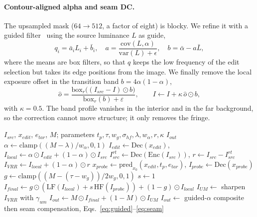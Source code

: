 \documentclass[10pt,twocolumn,letterpaper]{article}
\newcommand{\HF}{\mathrm{HF}}
\newcommand{\LF}{\mathrm{LF}}
\newcommand{\Dec}{\mathrm{Dec}}
\newcommand{\Enc}{\mathrm{Enc}}
\begin{document}
\paragraph{Contour-aligned alpha and seam DC.} The upsampled mask
($64\!\rightarrow\!512$, a factor of eight) is blocky. We refine it with a guided
filter~\cite{guided} using the source luminance $L$ as guide,
\begin{equation}
  q_i=\bar a_i L_i+\bar b_i,\quad
  a=\frac{\mathrm{cov}(L,\alpha)}{\mathrm{var}(L)+\epsilon},\quad
  b=\bar\alpha-a\bar L,
  \label{eq:guided}
\end{equation}
where the means are box filters, so that $q$ keeps the low frequency of the edit
selection but takes its edge positions from the image. We finally remove the local
exposure offset in the transition band $b=4\alpha(1-\alpha)$,
\begin{equation}
  \hat o = \frac{\mathrm{box}_{r}\bigl((I_{src}-I)\odot b\bigr)}
               {\mathrm{box}_{r}(b)+\varepsilon},
  \qquad I \leftarrow I+\kappa\,\hat o\odot b,
  \label{eq:seam}
\end{equation}
with $\kappa=0.5$. The band profile vanishes in the interior and in the far
background, so the correction cannot move structure; it only removes the fringe.

\begin{algorithm}[t]
\caption{High-frequency completion for one frame}
\label{alg:hfc}
\small
\begin{algorithmic}[1]
\Require $I_{src}$, $x_{edit}$, $e_{tar}$, $M$; parameters $t_{p},\tau,w_{g},\sigma_{hf},\lambda,w_{\alpha},r,\kappa$
\Ensure $I_{out}$
\State $\alpha \gets \mathrm{clamp}((M-\lambda)/w_{\alpha},0,1)$
\State $I_{edit}\gets\Dec(x_{edit})$, \quad $I_{local}\gets \alpha\odot I_{edit}+(1-\alpha)\odot I_{src}$
\State $I^{rt}_{src}\gets\Dec(\Enc(I_{src}))$, \quad $r\gets I_{src}-I^{rt}_{src}$
\State $I_{VRR}\gets I_{local}+(1-\alpha)\odot r$ 
\State $x_{probe}\gets\mathrm{pred}_{x_0}(x_{edit},t_{p},e_{tar})$, \quad $I_{probe}\gets\Dec(x_{probe})$
\State $g\gets \mathrm{clamp}((M-(\tau-w_{g}))/2w_{g},0,1)$ 
\State $s\gets 1$ 
\State $I_{final}\gets g\odot(\LF(I_{local})+s\,\HF(I_{probe}))+(1-g)\odot I_{local}$
\State $I_{UM}\gets$ sharpen $I_{VRR}$ with $\gamma_{um}$ 
\State $I_{out}\gets M\odot I_{final}+(1-M)\odot I_{UM}$
\State $I_{out}\gets$ guided-$\alpha$ composite then seam compensation, Eqs.~\eqref{eq:guided}--\eqref{eq:seam}
\end{algorithmic}
\end{algorithm}
\end{document}
